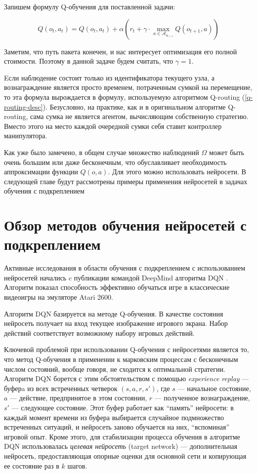 \documentclass[specification,annotation,times]{itmo-student-thesis}
\theoremstyle{definition}
\begin{document}
Запишем формулу Q-обучения для поставленной задачи:

\begin{equation}
Q(o_t, a_t) = Q(o_t, a_t) + \alpha \left( r_t +
\gamma \cdot \max\limits_{a \in \mathcal{A}_{o_{t+1}}} Q(o_{t+1}, a) \right)
\end{equation}

Заметим, что путь пакета конечен, и нас интересует оптимизация его полной
стоимости. Поэтому в данной задаче будем считать, что $\gamma = 1$.

Eсли наблюдение состоит только из идентификатора текущего
узла, а вознаграждение является просто временем, потраченным сумкой на
перемещение, то эта формула вырождается в формулу, используемую алгоритмом
Q-routing (\ref{q-routing-desc}). Безусловно, на практике, как и в оригинальном
алгоритме Q-routing, сама сумка не является агентом, вычисляющим собственную
стратегию. Вместо этого на место каждой очередной сумки себя ставит контроллер
манипулятора.

Как уже было замечено, в общем случае множество наблюдений $\Omega$ может быть
очень большим или даже бесконечным, что обуславливает необходимость
аппроксимации функции $Q(o, a)$. Для этого можно использовать нейросети. В
следующей главе будут рассмотрены примеры применения нейросетей в задачах
обучения с подкреплением

\section{Обзор методов обучения нейросетей с подкреплением}\label{overview:nns}

Активные исследования в области обучения с подкреплением с использованием
нейросетей начались c публикации командой DeepMind алгоритма
DQN \cite{deepmind-dqn-orig}. Алгоритм показал способность эффективно обучаться
игре в классические видеоигры на эмуляторе Atari 2600. 

Алгоритм DQN базируется на методе Q-обучения. В качестве состояния нейросеть
получает на вход текущее изображение игрового экрана. Набор действий
соответствует возможному набору игровых действий.

Ключевой проблемой при использовании Q-обучения с нейросетями является то, что
метод Q-обучения в применении к марковским процессам с бесконечным числом
состояний, вообще говоря, не сходится к оптимальной стратегии. Алгоритм DQN
борется с этим обстоятельством с помощью \textit{experience replay} --- буферa
из всех встреченных четверок $(s, a, r, s')$, где $s$ ---
начальное состояние, $a$ --- действие, предпринятое в этом состоянии, $r$ ---
полученное вознаграждение, $s'$ --- следующее состояние. Этот буфер работает как
\enquote{память} нейросети: в каждый момент времени из буфера выбирается случайное
подмножество встреченных ситуаций, и нейросеть заново обучается на них,
\enquote{вспоминая} игровой опыт. Кроме этого, для стабилизации процесса обучения в
алгоритме DQN использовалась \textit{целевая нейросеть} (target network) ---
дополнительная нейросеть, предоставляющая опорные оценки для основной сети и
копирующая ее состояние раз в $k$ шагов.
\end{document}
